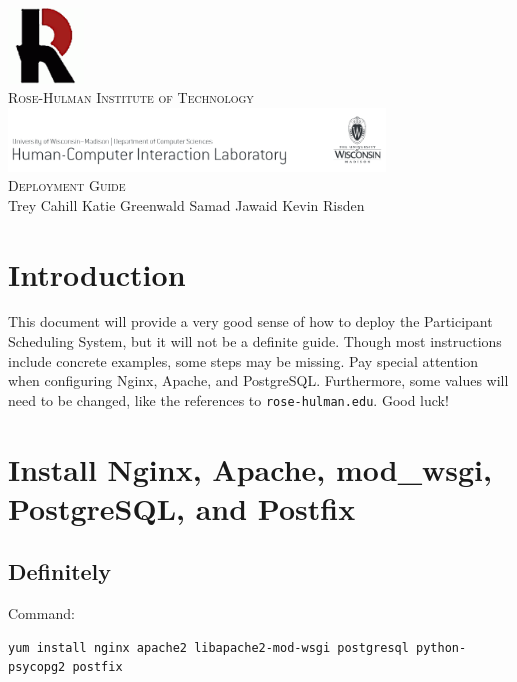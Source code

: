 \documentclass{article}
\begin{document}
\begin{titlepage}
\begin{center}
\includegraphics[width=0.15\textwidth]{images/rh}\\[1.0cm]
\textsc{\large Rose-Hulman Institute of Technology}\\[1.5cm]
\includegraphics[width=0.75\textwidth]{images/pss}\\[1.0cm]
\textsc{\large Deployment Guide}\\[1.0cm]
\large Trey Cahill \hspace{0.2cm} Katie Greenwald \hspace{0.2cm} Samad Jawaid \hspace{0.2cm} Kevin Risden
\end{center}
\end{titlepage}
\newpage

\section{Introduction}

This document will provide a very good sense of how to deploy the Participant
Scheduling System, but it will not be a definite guide. Though most instructions
include concrete examples, some steps may be missing. Pay special attention
when configuring Nginx, Apache, and PostgreSQL. Furthermore, some values will
need to be changed, like the references to \verb#rose-hulman.edu#. Good luck!

\section{Install Nginx, Apache, mod\_wsgi, PostgreSQL, and Postfix}

\subsection{Definitely}

Command:
\begin{verbatim}
yum install nginx apache2 libapache2-mod-wsgi postgresql python-psycopg2 postfix
\end{verbatim}
\end{document}
